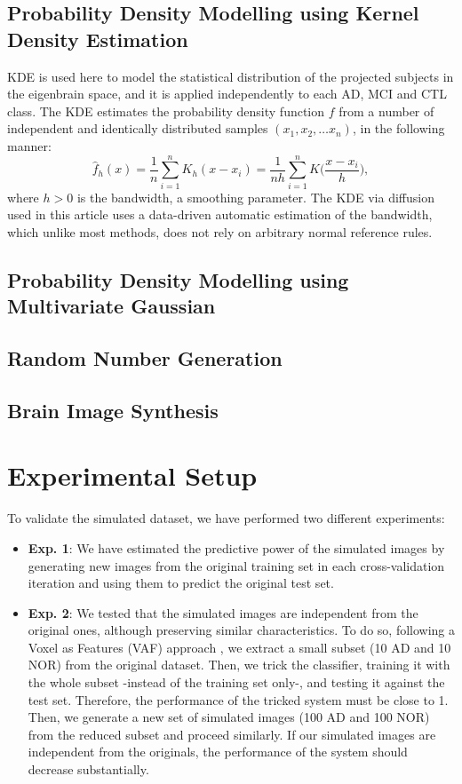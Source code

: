 \subsection{Probability Density Modelling using Kernel Density Estimation}
\ac{KDE} is used here to model the statistical distribution of the projected subjects in the eigenbrain space, and it is applied independently to each \ac{AD}, \ac{MCI} and \ac{CTL} class. The \ac{KDE} estimates the probability density function $f$ from a number of independent and identically distributed samples $(x_1, x_2, \dots x_n)$, in the following manner:
\begin{equation}
\hat{f}_h(x) = \frac{1}{n}\sum_{i=1}^n K_h (x - x_i) = \frac{1}{nh} \sum_{i=1}^n K\Big(\frac{x-x_i}{h}\Big),
\end{equation}
where $h>0$ is the bandwidth, a smoothing parameter. The \ac{KDE} via diffusion \cite{Botev2010} used in this article uses a data-driven automatic estimation of the bandwidth, which unlike most methods, does not rely on arbitrary normal reference rules. 

\subsection{Probability Density Modelling using Multivariate Gaussian}

\subsection{Random Number Generation}

\subsection{Brain Image Synthesis}
\section{Experimental Setup}

To validate the simulated dataset, we have performed two different experiments: 
\begin{itemize}
	\item \textbf{Exp. 1}: We have estimated the predictive power of the simulated images by generating new images from the original training set in each cross-validation iteration and using them to predict the original test set. 
	\item \textbf{Exp. 2}: We tested that the simulated images are independent from the original ones, although preserving similar characteristics. To do so, following a Voxel as Features (VAF) approach \cite{Stoeckel04}, we extract a small subset (10 AD and 10 NOR) from the original dataset. Then, we trick the classifier, training it with the whole subset -instead of the training set only-, and testing it against the test set. Therefore, the performance of the tricked system must be close to 1. Then, we generate a new set of simulated images (100 AD and 100 NOR) from the reduced subset and proceed similarly. If our simulated images are independent from the originals, the performance of the system should decrease substantially. 
	
	\end{itemize}
	
